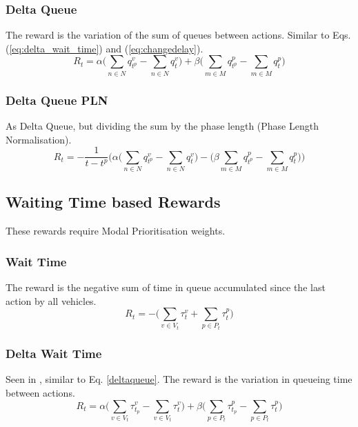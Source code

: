 \documentclass[conference]{IEEEtran}
\begin{document}
\subsubsection{Delta Queue}
The reward is the variation of the sum of queues between actions.
Similar to Eqs. (\ref{eq:delta_wait_time}) and (\ref{eq:changedelay}).
\begin{equation}
    R_t = \alpha \bigg( \sum_{n \in N} q^v_{t^p} -\sum_{n \in N} q^v_{t} \bigg) + \beta \bigg( \sum_{m \in M} q^p_{t^p} - \sum_{m \in M} q^p_{t} \bigg)
    \label{deltaqueue}
\end{equation}

\subsubsection{Delta Queue PLN}
As Delta Queue, but dividing the sum by the phase length (Phase Length Normalisation).
\begin{equation}
    R_t = - \frac{1}{t-t^p} \bigg( \alpha \big( \sum_{n \in N} q^v_{t^p} - \sum_{n \in N} q^v_{t} \big) - 
    \big( \beta \sum_{m \in M} q^p_{t^p}  - \sum_{m \in M} q^p_{t} \big) \bigg)
    \label{queuepln}
\end{equation}

\subsection{Waiting Time based Rewards}
These rewards require Modal Prioritisation weights.
\subsubsection{Wait Time}
The reward is the negative sum of time in queue accumulated since the last action by all vehicles. 
\begin{equation}
R_t = - \bigg( \sum_{v \in V_t} \tau^v_{t} + \sum_{p \in P_t} \tau^p_{t} \bigg)
\label{eq:wait_time}
\end{equation}

\subsubsection{Delta Wait Time}
Seen in \cite{liang2018}, similar to Eq. \ref{deltaqueue}. The reward is the variation in queueing time between actions.
\begin{equation}
R_t = \alpha \bigg( \sum_{v \in V_t} \tau^v_{t_p} -  \sum_{v \in V_t} \tau^v_{t} \bigg) + \beta \bigg( \sum_{p \in P_t} \tau^p_{t_p} -  \sum_{p \in P_t} \tau^p_{t} \bigg)
\label{eq:delta_wait_time}
\end{equation}
\end{document}
